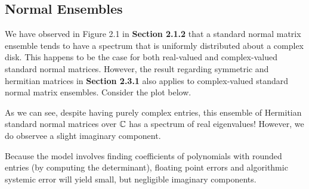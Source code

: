 \newpage
\subsection{Normal Ensembles}

%


We have observed in Figure 2.1 in \textbf{Section 2.1.2} that a standard normal matrix ensemble tends to have a spectrum that is uniformly distributed about a complex disk. This happens to be the case for both real-valued and complex-valued standard normal matrices. However, the result regarding symmetric and hermitian matrices in \textbf{Section 2.3.1} also applies to complex-valued standard normal matrix ensembles. Consider the plot below.


As we can see, despite having purely complex entries, this ensemble of Hermitian standard normal matrices over $\mathbb{C}$ has a spectrum of real eigenvalues!
However, we do observee a slight imaginary component.

\begin{remark}
Because the model involves finding coefficients of polynomials with rounded entries (by computing the determinant),
floating point errors and algorithmic systemic error will yield small, but negligible imaginary components.
\end{remark}
